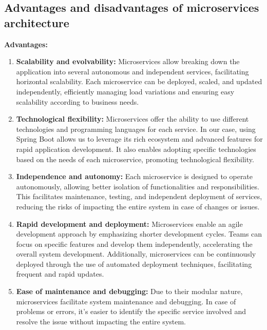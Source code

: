 \subsection{Advantages and disadvantages of microservices architecture}
\textbf{Advantages:}
\begin{enumerate}
\item \textbf{Scalability and evolvability:} Microservices allow breaking down the application into several autonomous and independent services, facilitating horizontal scalability. Each microservice can be deployed, scaled, and updated independently, efficiently managing load variations and ensuring easy scalability according to business needs.
\item \textbf{Technological flexibility:} Microservices offer the ability to use different technologies and programming languages for each service. In our case, using Spring Boot allows us to leverage its rich ecosystem and advanced features for rapid application development. It also enables adopting specific technologies based on the needs of each microservice, promoting technological flexibility.
\item \textbf{Independence and autonomy:} Each microservice is designed to operate autonomously, allowing better isolation of functionalities and responsibilities. This facilitates maintenance, testing, and independent deployment of services, reducing the risks of impacting the entire system in case of changes or issues.
\item \textbf{Rapid development and deployment:} Microservices enable an agile development approach by emphasizing shorter development cycles. Teams can focus on specific features and develop them independently, accelerating the overall system development. Additionally, microservices can be continuously deployed through the use of automated deployment techniques, facilitating frequent and rapid updates.
\item \textbf{Ease of maintenance and debugging:} Due to their modular nature, microservices facilitate system maintenance and debugging. In case of problems or errors, it's easier to identify the specific service involved and resolve the issue without impacting the entire system.
\end{enumerate}


